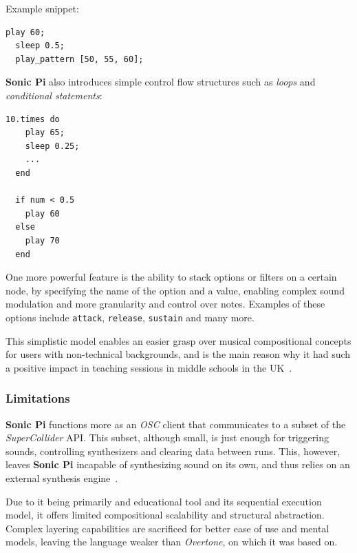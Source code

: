 Example snippet:
\begin{lstlisting}[label={lst:sonic-pi-1}]
  play 60;
  sleep 0.5;
  play_pattern [50, 55, 60];
\end{lstlisting}

\textbf{Sonic Pi} also introduces simple control flow structures such as \textit{loops} and
\textit{conditional statements}:
\begin{lstlisting}[label={lst:loops-and-conditional-statements}]
  10.times do
    play 65;
    sleep 0.25;
    ...
  end

  if num < 0.5
    play 60
  else
    play 70
  end
\end{lstlisting}

One more powerful feature is the ability to stack options or filters on a certain node, by specifying the name of the
option and a value, enabling complex sound modulation and more granularity and control over notes.
Examples of these options include \texttt{attack}, \texttt{release}, \texttt{sustain} and many more.

This simplistic model enables an easier grasp over musical compositional concepts for users with non-technical
backgrounds, and is the main reason why it had such a positive impact in teaching sessions in middle schools in the
UK~\cite{Aaron_2016, Aaron_Blackwell_2013}.


\subsubsection{Limitations}

\textbf{Sonic Pi} functions more as an \textit{OSC} client that communicates to a subset of the \textit{SuperCollider}
API\@.
This subset, although small, is just enough for triggering sounds, controlling synthesizers and clearing data between
runs.
This, however, leaves \textbf{Sonic Pi} incapable of synthesizing sound on its own, and thus relies on an external
synthesis engine~\cite{Aaron_Blackwell_2013}.

Due to it being primarily and educational tool and its sequential execution model, it offers limited compositional
scalability and structural abstraction.
Complex layering capabilities are sacrificed for better ease of use and mental models, leaving the language weaker than
\textit{Overtone}, on which it was based on.

